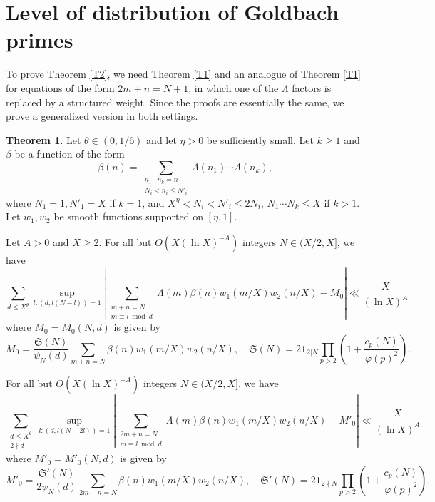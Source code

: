 \documentclass{amsart}
\theoremstyle{definition}
\newtheorem{thm}[dfn]{Theorem}
\theoremstyle{remark}
\newcommand{\1}{
    \bm{1}
}
\begin{document}
\section{Level of distribution of Goldbach primes}




To prove Theorem \ref{T2}, we need Theorem \ref{T1} and an analogue of Theorem \ref{T1} for equations of the form $2m+n=N+1$, in which one of the $\Lambda$ factors is replaced by a structured weight. 
Since the proofs are essentially the same, we prove a generalized version in both settings. 

\begin{thm}\label{T1p}
Let $\theta \in (0,1/6)$ and let $\eta>0$ be sufficiently small. 
Let $k \geq 1$ and $\beta$ be a function of the form
\[ \beta(n) = \sum_{\substack{n_1 \cdots n_k=n \\ N_i<n_i \leq N'_i}} \Lambda(n_1) \cdots \Lambda(n_k), \]
where $N_1=1,N'_1=X$ if $k=1$, and $X^{\eta}<N_i <N'_i \leq 2N_i$, $N_1 \cdots N_k \leq X$ if $k>1$. 
Let $w_1,w_2$ be smooth functions supported on $[\eta,1]$. 

Let $A>0$ and $X \geq 2$. For all but $O(X(\ln{X})^{-A})$ integers $N \in (X/2,X]$, we have
\[ \sum_{d \leq X^{\theta}} \sup_{l:(d,l(N-l))=1} \left| \sum_{\substack{m+n=N \\ m \equiv l \bmod d}} \Lambda(m) \beta(n) w_1(m/X) w_2(n/X) - M_0 \right| \ll \frac{X}{(\ln{X})^A} \]
where $M_0=M_0(N,d)$ is given by
\[ M_0 = \frac{\mathfrak{S}(N)}{\psi_N(d)} \sum_{m+n=N} \beta(n) w_1(m/X) w_2(n/X), \quad \mathfrak{S}(N) = 2 \1_{2 | N} \prod_{p>2} \left( 1 + \frac{c_p(N)}{\varphi(p)^2} \right). \]

For all but $O(X(\ln{X})^{-A})$ integers $N \in (X/2,X]$, we have
\[ \sum_{\substack{d \leq X^{\theta} \\ 2 \nmid d}} \sup_{l:(d,l(N-2l))=1} \left| \sum_{\substack{2m+n=N \\ m \equiv l \bmod d}} \Lambda(m) \beta(n) w_1(m/X) w_2(n/X) - M'_0 \right| \ll \frac{X}{(\ln{X})^A} \]
where $M'_0=M'_0(N,d)$ is given by
\[ M'_0 = \frac{\mathfrak{S}'(N)}{2\psi_N(d)} \sum_{2m+n=N} \beta(n) w_1(m/X) w_2(n/X), \quad \mathfrak{S}'(N) = 2 \1_{2 \nmid N} \prod_{p>2} \left( 1 + \frac{c_p(N)}{\varphi(p)^2} \right). \]
\end{thm}
\end{document}

